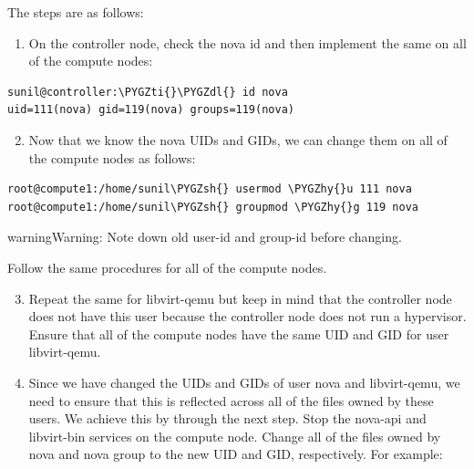 \documentclass[letterpaper,10pt,english]{sphinxmanual}
\def\PYGZsh{\char`\#}
\def\PYGZdl{\char`\$}
\def\PYGZhy{\char`\-}
\def\PYGZti{\char`\~}
\begin{document}
The steps are as follows:
\begin{enumerate}
\item {} 
On the controller node, check the nova id and then implement the same on all of the compute nodes:

\end{enumerate}

\begin{Verbatim}[commandchars=\\\{\}]
sunil@controller:\PYGZti{}\PYGZdl{} id nova
uid=111(nova) gid=119(nova) groups=119(nova)
\end{Verbatim}
\begin{enumerate}
\setcounter{enumi}{1}
\item {} 
Now that we know the nova UIDs and GIDs, we can change them on all of the compute nodes as follows:

\end{enumerate}

\begin{Verbatim}[commandchars=\\\{\}]
root@compute1:/home/sunil\PYGZsh{} usermod \PYGZhy{}u 111 nova
root@compute1:/home/sunil\PYGZsh{} groupmod \PYGZhy{}g 119 nova
\end{Verbatim}

\begin{notice}{warning}{Warning:}
Note down old user-id and group-id before changing.
\end{notice}

Follow the same procedures for all of the compute nodes.
\begin{enumerate}
\setcounter{enumi}{2}
\item {} 
Repeat the same for libvirt-qemu but keep in mind that the controller node does not have this user because the controller node does not run a hypervisor. Ensure that all of the compute nodes have the same UID and GID for user libvirt-qemu.

\item {} 
Since we have changed the UIDs and GIDs of user nova and libvirt-qemu, we need to ensure that this is reflected across all of the files owned by these users. We achieve this by through the next step. Stop the nova-api and libvirt-bin services on the compute node. Change all of the files owned by nova and nova group to the new UID and GID, respectively. For example:

\end{enumerate}
\end{document}

